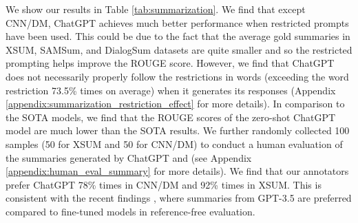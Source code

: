 \documentclass[11pt]{article}
\begin{document}
\begin{table}
\centering
\small 
\setlength{\tabcolsep}{3pt}
\vspace{-1em}
\caption{Performance on Commonsense Reasoning.}
\label{tab:common_sense}
\end{table} We show our results in Table \ref{tab:summarization}. We find that except CNN/DM, ChatGPT achieves much better performance when restricted prompts have been used. This could be due to the fact that the average gold summaries in XSUM, SAMSum, and DialogSum datasets are quite smaller and so the restricted prompting helps improve the ROUGE score. However, we find that ChatGPT does not necessarily properly follow the restrictions in words (exceeding the word restriction 73.5\% times on average) when it generates its responses (Appendix \ref{appendix:summarization_restriction_effect} for more details). In comparison to the SOTA models, we find that the ROUGE scores of the zero-shot ChatGPT model 
are much lower than the SOTA results. We further randomly collected 100 samples (50 for XSUM and 50 for CNN/DM) to conduct a human evaluation of the summaries generated by ChatGPT and \citet{ravaut2022summareranker} (see Appendix \ref{appendix:human_eval_summary} for more details). We find that our annotators prefer ChatGPT 78\% times in CNN/DM and 92\% times in XSUM. This is consistent with the recent findings \cite{yixin-acl23,goyal2022news}, where summaries from GPT-3.5 are preferred compared to fine-tuned models in reference-free evaluation. 
  
\end{document}
